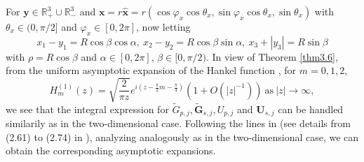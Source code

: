 \documentclass[final,reqno]{siamltex}
\newcommand{\wid}{\widetilde}
\newcommand{\mat}{\mathbb}
\newcommand{\R}{{\mat R}}
\begin{document}
For $\mathbf{y}\in\R^3_+\cup\R^3_-$ and $\mathbf{x}=r\mathbf{\hat x}=r(\cos\varphi_x\cos\theta_x,\sin\varphi_x\cos\theta_x,\sin\theta_x)$ with $\theta_x\in(0,\pi/2]$ and $\varphi_x\in[0,2\pi]$, now letting 
$$
  x_1-y_1=R\cos\beta\cos\alpha,~x_2-y_2=R\cos\beta\sin\alpha,~x_3+|y_3|=R\sin\beta
$$
with $\rho=R\cos\beta$ and $\alpha\in[0,2\pi]$, $\beta\in[0,\pi/2)$. In view of Theorem \ref{thm3.6}, from the uniform asymptotic expansion of the Hankel function \cite{GN95}, for $m=0,1,2$, 
$$
  H_m^{(1)}(z)=\sqrt{\frac{2}{\pi z}}e^{i(z-\frac{\pi}{2}m-\frac{\pi}{4})}\left(1+O(|z|^{-1})\right)~\text{as}~|z|\rightarrow\infty, 
$$
we see that the integral expression for $\wid G_{p,j},\mathbf{\wid G}_{s,j},U_{p,j}$ and $\mathbf{U}_{s,j}$ can be handled similarily as in the two-dimensional case. Following the lines in \cite[Section 2.3.4]{CP17} (see details from (2.61) to (2.74) in \cite{CP17}), analyzing analogously as in the two-dimensional case, we can obtain the corresponding asymptotic expansions. 
\end{document}
